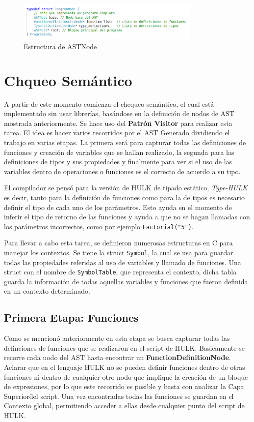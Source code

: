 \documentclass[11pt, a4paper, twoside]{article} %
\begin{document}
\begin{figure}[h!]
    \centering
    \includegraphics[width=0.8\textwidth]{ProgramNode.png}
    \caption{Estructura de ASTNode}
\end{figure}

\section{Chqueo Sem\'antico}
A partir de este momento comienza el chequeo sem\'antico, el cual est\'a implementado sin usar librer\'ias, bas\'andose en la definici\'on de nodos de AST mostrada
anteriormente. Se hace uso del \textbf{Patr\'on Visitor} para realizar esta tarea. El idea es hacer varios recorridos por el AST Generado dividiendo el trabajo en
varias etapas. La primera ser\'a para capturar todas las definiciones de funciones y creaci\'on de variables que se hallan realizado, la segunda para las definiciones 
de tipos y sus propiedades y finalmente para ver si el uso de las variables dentro de operaciones o funciones es el correcto de acuerdo a su tipo.

El compilador se pens\'o para la versi\'on de HULK de tipado est\'atico, \textit{Type-HULK} es decir, tanto para la definici\'on de funciones como para la de tipos
es necesario definir el tipo de cada uno de los par\'ametros. Esto ayuda en el momento de inferir el tipo de retorno de las funciones y ayuda a que no se hagan llamadas 
con los par\'ametros incorrectos, como por ejemplo \texttt{Factorial("5")}. 

Para llevar a cabo esta tarea, se definieron numerosas estructuras en C para manejar los contextos. Se tiene la struct \texttt{Symbol}, la cual se usa
para guardar todas las propiedades referidas al uso de variables y llamado de funciones. Una struct con el nombre de \texttt{SymbolTable}, que representa el contexto,
dicha tabla guarda la informaci\'on de todas aquellas variables y funciones que fueron definida en un contexto determinado. 

\subsection{Primera Etapa: Funciones}
Como se mencion\'o anteriormente en esta etapa se busca capturar todas las definciones de funciones que se realizaron en el script de HULK. Basicamente se recorre cada nodo
del AST hasta encontrar un \textbf{FunctionDefinitionNode}. Aclarar que en el lenguaje HULK no se pueden definir funciones dentro de otras funciones ni dentro de cualquier otro
nodo que implique la creaci\'on de un bloque de expresiones, por lo que este recorrido es posible y basta con analizar la \"Capa Superior\" del script.
Una vez encontradas todas las funciones se guardan en el Contexto global, permitiendo acceder a ellas desde cualquier punto del script de HULK.
\end{document}
